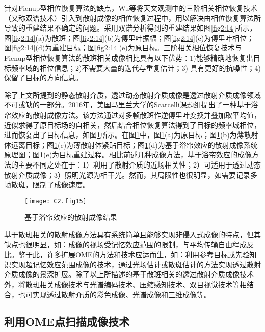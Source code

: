 针对Fienup型相位恢复算法的缺点，Wu等\cite{wu_single-shot_2016}将天文观测中的三阶相关相位恢复技术（又称双谱技术）引入到散射成像的相位恢复过程中，用以解决由相位恢复算法所导致的重建结果不确定的问题。采用双谱分析得到的重建结果如图\ref{fig2:14}所示\cite{wu_single-shot_2016}，图\ref{fig2:14}(a)为散斑；图\ref{fig2:14}(b)为傅里叶振幅；图\ref{fig2:14}(c)为傅里叶相位；图\ref{fig2:14}(d)为重建目标；图\ref{fig2:14}(e)为原目标。三阶相关相位恢复技术与Fienup型相位恢复算法的散斑相关成像相比具有以下优势：1)能够精确地恢复出目标频率域的相位信息；2)不需要大量的迭代与重复估计；3) 具有更好的抗噪性；4)保留了目标的方向信息。

除了上文所提到的静态散射介质，透过动态散射介质成像是透过散射介质成像领域不可或缺的一部分\cite{edrei_optical_2016,singh_looking_2014}。2016年，美国马里兰大学的Scarcelli课题组\cite{edrei_optical_2016}提出了一种基于浴帘效应的散射成像方法。该方法通过对多帧散斑作逆傅里叶变换并叠加取平均值，近似求得了原目标场的自相关，然后结合相位恢复算法得到了目标的频率域相位，进而恢复出了目标信息，如图\ref{fig2:15}所示\cite{edrei_optical_2016}。在图\ref{fig2:15}中，图\ref{fig2:15}(a)为原目标；图\ref{fig2:15}(b)为薄散射体远离目标；图\ref{fig2:15}(c)为薄散射体紧贴目标；图\ref{fig2:15}(d)为基于浴帘效应的散射成像系统原理图；图\ref{fig2:15}(e)为目标重建过程。相比前述几种成像方法，基于浴帘效应的成像方法的主要不同之处在于：1）利用了散射介质的近场相关性；2）可适用于透过动态散射介质成像；3）照明光源为相干光。然而，其局限性也很明显，如需要记录多帧散斑，限制了成像速度。

\begin{figure}[htp]
	\centering
	\texttt{[image: C2.fig15]}
	\caption{基于浴帘效应的散射成像结果}
	\label{fig2:15}
\end{figure}

基于散斑相关的散射成像方法具有系统简单且能够实现非侵入式成像的特点，但其缺点也很明显，如：成像的视场受记忆效应范围的限制，与平均传输自由程成反比。鉴于此，许多扩展OME的方法和技术应运而生，如：利用参考目标\cite{yang_imaging_2018}或先验知识\cite{wang_prior-information-free_2019}实现超记忆效应范围成像的技术，通过光场估计\cite{jin_depth_2018}或散斑估计\cite{liao_extending_2019}的方法实现透过散射介质成像的景深扩展。除了以上所描述的基于散斑相关的透过散射介质成像技术外，将散斑相关成像技术与光谱编码技术\cite{sahoo_single-shot_2017}、压缩感知技术\cite{candes_introduction_2008,rudin_nonlinear_1992}、双目视觉技术\cite{brady_compressive_2009,mukherjee_3d_2018}等相结合，也可实现透过散射介质的彩色成像、光谱成像和三维成像等。
\subsection{利用OME点扫描成像技术}

